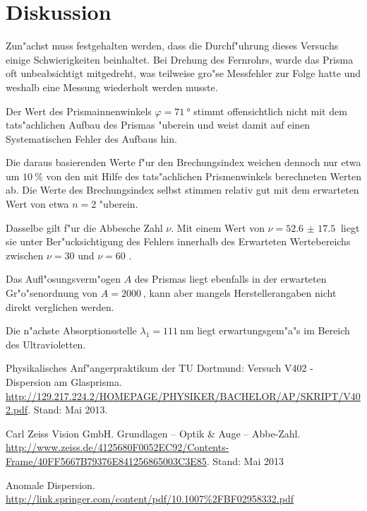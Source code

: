 \clearpage

\section{Diskussion}
\label{sec:diskussion}
	Zun"achst muss festgehalten werden, dass die Durchf"uhrung dieses Versuchs einige Schwierigkeiten beinhaltet.
	Bei Drehung des Fernrohrs, wurde das Prisma oft unbeabsichtigt mitgedreht, was teilweise gro"se Messfehler zur Folge hatte und weshalb eine Messung wiederholt werden musste.
	
	Der Wert des Prismainnenwinkels $\varphi = \SI{71}{\degree}$ stimmt offensichtlich nicht mit dem tats"achlichen Aufbau des Prismas "uberein und weist damit auf einen Systematischen Fehler des Aufbaus hin.

	Die daraus basierenden Werte f"ur den Brechungsindex weichen dennoch nur etwa um $\SI{10}{\percent}$ von den mit Hilfe des tats"achlichen Prismenwinkels berechneten Werten ab.
	Die Werte des Brechungsindex selbst stimmen relativ gut mit dem erwarteten Wert von etwa $n = 2$ "uberein.

	Dasselbe gilt f"ur die Abbesche Zahl $\nu$.
	Mit einem Wert von $\nu = \SI{52.6(175)}{}$ liegt sie unter Ber"ucksichtigung des Fehlers innerhalb des Erwarteten Wertebereichs zwischen $\nu = 30$ und $\nu = 60$ \cite{abbe}.

	Das Aufl"osungsverm"ogen $A$ des Prismas liegt ebenfalls in der erwarteten Gr"o"senordnung von $A = \SI{2000}{}$, kann aber mangels Herstellerangaben nicht direkt verglichen werden.

	Die n"achste Absorptionsstelle $\lambda_1 = \SI{111}{\nano \meter}$ liegt erwartungsgem"a"s im Bereich des Ultravioletten.


\begin{thebibliography}{9}
	 Physikalisches Anf"angerpraktikum der TU Dortmund: Versuch V402 - Dispersion am Glasprisma. \url{http://129.217.224.2/HOMEPAGE/PHYSIKER/BACHELOR/AP/SKRIPT/V402.pdf}. Stand: Mai 2013.

	 Carl Zeiss Vision GmbH. Grundlagen -- Optik \& Auge -- Abbe-Zahl. \url{http://www.zeiss.de/4125680F0052EC92/Contents-Frame/40FF5667B79376E841256865003C3E85}. Stand: Mai 2013

	 Anomale Dispersion. \url{http://link.springer.com/content/pdf/10.1007%2FBF02958332.pdf}
\end{thebibliography}
